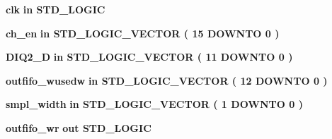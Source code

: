 \begin{DoxyCompactItemize}
{\bf clk}  {\bfseries {\bfseries \textcolor{keywordflow}{in}\textcolor{vhdlchar}{ }}} {\bfseries \textcolor{comment}{S\+T\+D\+\_\+\+L\+O\+G\+IC}\textcolor{vhdlchar}{ }} 
\item 
{\bf ch\+\_\+en}  {\bfseries {\bfseries \textcolor{keywordflow}{in}\textcolor{vhdlchar}{ }}} {\bfseries \textcolor{comment}{S\+T\+D\+\_\+\+L\+O\+G\+I\+C\+\_\+\+V\+E\+C\+T\+OR}\textcolor{vhdlchar}{ }\textcolor{vhdlchar}{(}\textcolor{vhdlchar}{ }\textcolor{vhdlchar}{ } \textcolor{vhdldigit}{15} \textcolor{vhdlchar}{ }\textcolor{keywordflow}{D\+O\+W\+N\+TO}\textcolor{vhdlchar}{ }\textcolor{vhdlchar}{ } \textcolor{vhdldigit}{0} \textcolor{vhdlchar}{ }\textcolor{vhdlchar}{)}\textcolor{vhdlchar}{ }} 
\item 
{\bf D\+I\+Q2\+\_\+D}  {\bfseries {\bfseries \textcolor{keywordflow}{in}\textcolor{vhdlchar}{ }}} {\bfseries \textcolor{comment}{S\+T\+D\+\_\+\+L\+O\+G\+I\+C\+\_\+\+V\+E\+C\+T\+OR}\textcolor{vhdlchar}{ }\textcolor{vhdlchar}{(}\textcolor{vhdlchar}{ }\textcolor{vhdlchar}{ } \textcolor{vhdldigit}{11} \textcolor{vhdlchar}{ }\textcolor{keywordflow}{D\+O\+W\+N\+TO}\textcolor{vhdlchar}{ }\textcolor{vhdlchar}{ } \textcolor{vhdldigit}{0} \textcolor{vhdlchar}{ }\textcolor{vhdlchar}{)}\textcolor{vhdlchar}{ }} 
\item 
{\bf outfifo\+\_\+wusedw}  {\bfseries {\bfseries \textcolor{keywordflow}{in}\textcolor{vhdlchar}{ }}} {\bfseries \textcolor{comment}{S\+T\+D\+\_\+\+L\+O\+G\+I\+C\+\_\+\+V\+E\+C\+T\+OR}\textcolor{vhdlchar}{ }\textcolor{vhdlchar}{(}\textcolor{vhdlchar}{ }\textcolor{vhdlchar}{ } \textcolor{vhdldigit}{12} \textcolor{vhdlchar}{ }\textcolor{keywordflow}{D\+O\+W\+N\+TO}\textcolor{vhdlchar}{ }\textcolor{vhdlchar}{ } \textcolor{vhdldigit}{0} \textcolor{vhdlchar}{ }\textcolor{vhdlchar}{)}\textcolor{vhdlchar}{ }} 
\item 
{\bf smpl\+\_\+width}  {\bfseries {\bfseries \textcolor{keywordflow}{in}\textcolor{vhdlchar}{ }}} {\bfseries \textcolor{comment}{S\+T\+D\+\_\+\+L\+O\+G\+I\+C\+\_\+\+V\+E\+C\+T\+OR}\textcolor{vhdlchar}{ }\textcolor{vhdlchar}{(}\textcolor{vhdlchar}{ }\textcolor{vhdlchar}{ } \textcolor{vhdldigit}{1} \textcolor{vhdlchar}{ }\textcolor{keywordflow}{D\+O\+W\+N\+TO}\textcolor{vhdlchar}{ }\textcolor{vhdlchar}{ } \textcolor{vhdldigit}{0} \textcolor{vhdlchar}{ }\textcolor{vhdlchar}{)}\textcolor{vhdlchar}{ }} 
\item 
{\bf outfifo\+\_\+wr}  {\bfseries {\bfseries \textcolor{keywordflow}{out}\textcolor{vhdlchar}{ }}} {\bfseries \textcolor{comment}{S\+T\+D\+\_\+\+L\+O\+G\+IC}\textcolor{vhdlchar}{ }} 

\end{DoxyCompactItemize}
